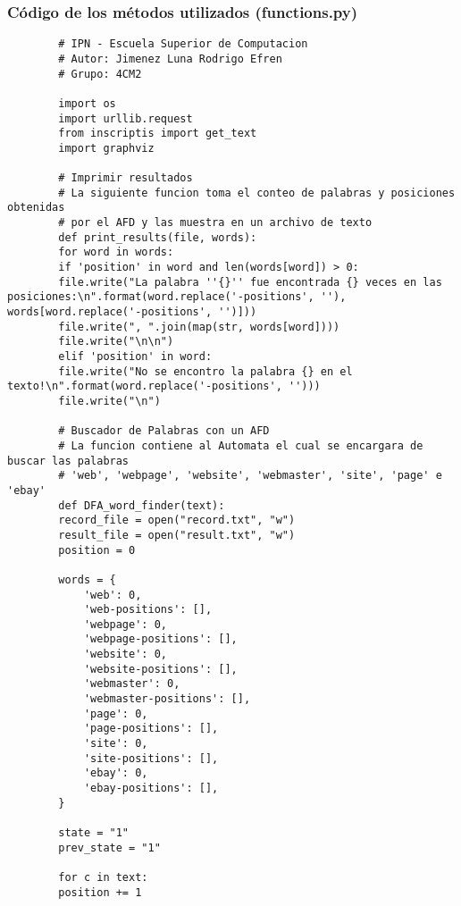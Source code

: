 \documentclass{article}
\begin{document}
	\subsubsection{Código de los métodos utilizados (functions.py)}
	
	\begin{lstlisting}
		# IPN - Escuela Superior de Computacion
		# Autor: Jimenez Luna Rodrigo Efren
		# Grupo: 4CM2
		
		import os
		import urllib.request
		from inscriptis import get_text
		import graphviz
		
		# Imprimir resultados
		# La siguiente funcion toma el conteo de palabras y posiciones obtenidas
		# por el AFD y las muestra en un archivo de texto
		def print_results(file, words):
		for word in words:
		if 'position' in word and len(words[word]) > 0:
		file.write("La palabra ''{}'' fue encontrada {} veces en las posiciones:\n".format(word.replace('-positions', ''), words[word.replace('-positions', '')]))
		file.write(", ".join(map(str, words[word])))
		file.write("\n\n")
		elif 'position' in word:
		file.write("No se encontro la palabra {} en el texto!\n".format(word.replace('-positions', '')))
		file.write("\n")
		
		# Buscador de Palabras con un AFD
		# La funcion contiene al Automata el cual se encargara de buscar las palabras
		# 'web', 'webpage', 'website', 'webmaster', 'site', 'page' e 'ebay'
		def DFA_word_finder(text):
		record_file = open("record.txt", "w")
		result_file = open("result.txt", "w")
		position = 0
		
		words = {
			'web': 0,
			'web-positions': [],
			'webpage': 0,
			'webpage-positions': [],
			'website': 0,
			'website-positions': [],
			'webmaster': 0,
			'webmaster-positions': [],
			'page': 0,
			'page-positions': [],
			'site': 0,
			'site-positions': [],
			'ebay': 0,
			'ebay-positions': [],
		}
		
		state = "1"
		prev_state = "1"
		
		for c in text:
		position += 1
		

\end{lstlisting}
\end{document}

